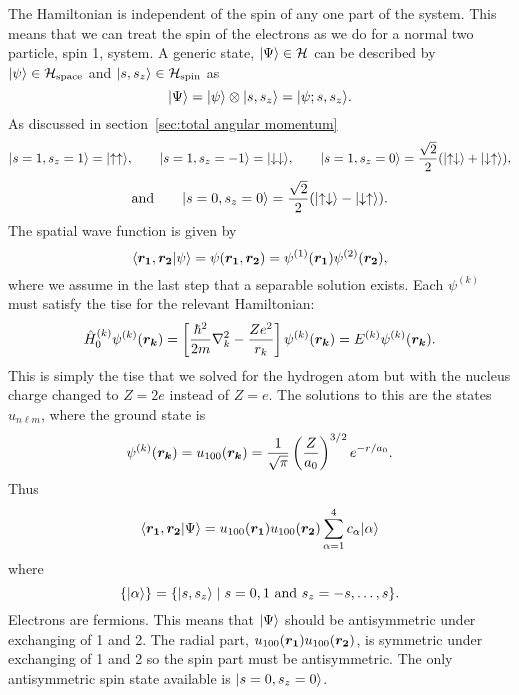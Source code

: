 The Hamiltonian is independent of the spin of any one part of the system.
This means that we can treat the spin of the electrons as we do for a normal two particle, spin 1, system.
A generic state, \(\vert {\Psi} \rangle\in \mathcal{H}\) can be described by \(\vert {\psi} \rangle\in\mathcal{H}_{\text{space}}\) and \(\vert {s, s_z} \rangle\in\mathcal{H}_{\text{spin}}\) as
\[\vert {\Psi} \rangle = \vert {\psi} \rangle \otimes \vert {s, s_z} \rangle = \vert {\psi; s, s_z} \rangle.\]
As discussed in section~\ref{sec:total angular momentum}
\[\vert {s=1, s_z=1} \rangle = \vert {\uparrow\uparrow} \rangle, \qquad \vert {s=1, s_z=-1} \rangle = \vert {\downarrow\downarrow} \rangle, \qquad\vert {s=1, s_z=0} \rangle = \frac{\sqrt{2}}{2}(\vert {\uparrow\downarrow} \rangle + \vert {\downarrow\uparrow} \rangle),\]
\[\text{and}\qquad \vert {s=0, s_z=0} \rangle = \frac{\sqrt{2}}{2}(\vert {\uparrow\downarrow} \rangle - \vert {\downarrow\uparrow} \rangle).\]
The spatial wave function is given by
\[\langle {\bm{r_1}, \bm{r_2}} \vert {\psi} \rangle = \psi(\bm{r_1}, \bm{r_2}) = \psi^{(1)}(\bm{r_1})\psi^{(2)}(\bm{r_2}),\]
where we assume in the last step that a separable solution exists.
Each \(\psi^{(k)}\) must satisfy the \gls{tise} for the relevant Hamiltonian:
\[\hat{H}_0^{(k)}\psi^{(k)}(\bm{r_k}) = \left[\frac{\hbar^2}{2m}\nabla^2_k - \frac{Ze^2}{r_k}\right]\psi^{(k)}(\bm{r_k}) = E^{(k)}\psi^{(k)}(\bm{r_k}).\]
This is simply the \gls{tise} that we solved for the hydrogen atom but with the nucleus charge changed to \(Z = 2e\) instead of \(Z = e\).
The solutions to this are the states \(u_{n\ell m}\), where the ground state is
\[\psi^{(k)}(\bm{r_k}) = u_{100}(\bm{r_k}) = \frac{1}{\sqrt{\pi}} \left(\frac{Z}{a_0}\right)^{3/2}e^{-r/a_0}.\]
Thus
\[\langle {\bm{r_1}, \bm{r_2}} \vert {\Psi} \rangle = u_{100}(\bm{r_1})u_{100}(\bm{r_2})\sum_{\alpha = 1}^{4}c_\alpha\vert {\alpha} \rangle\]
where
\[\{\vert {\alpha} \rangle\} = \{\vert {s, s_z} \rangle\mid s = 0, 1~\text{and}~s_z = -s, \dotsc, s\}.\]
Electrons are fermions.
This means that \(\vert {\Psi} \rangle\) should be antisymmetric under exchanging of 1 and 2.
The radial part, \(u_{100}(\bm{r_1})u_{100}(\bm{r_2})\), is symmetric under exchanging of 1 and 2 so the spin part must be antisymmetric.
The only antisymmetric spin state available is \(\vert {s = 0, s_z = 0} \rangle\).


